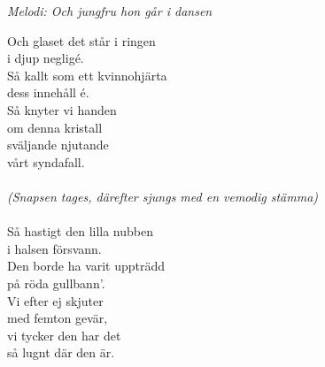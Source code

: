 {\footnotesize\textit{Melodi: Och jungfru hon går i dansen}}\par
\vspace{10pt}
Och glaset det står i ringen\\
i djup negligé.\\
Så kallt som ett kvinnohjärta\\
dess innehåll é.\\
Så knyter vi handen\\
om denna kristall\\
sväljande njutande\\
vårt syndafall.\\
\\
\textit{(Snapsen tages, därefter sjungs med en vemodig stämma)}\\
\\
Så hastigt den lilla nubben\\
i halsen försvann.\\
Den borde ha varit uppträdd\\
på röda gullbann'.\\
Vi efter ej skjuter\\
med femton gevär,\\
vi tycker den har det\\
så lugnt där den är.
